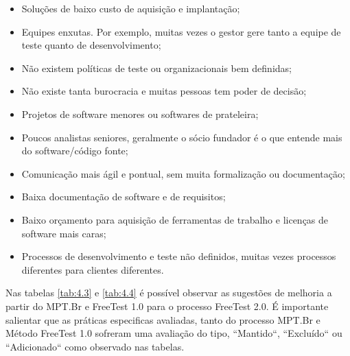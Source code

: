 \begin{itemize}
    \item Soluções de baixo custo de aquisição e implantação;
    \item Equipes enxutas. Por exemplo, muitas vezes o gestor gere tanto a equipe de teste quanto de desenvolvimento;
    \item Não existem políticas de teste ou organizacionais bem definidas;
    \item Não existe tanta burocracia e muitas pessoas tem poder de decisão;
    \item Projetos de software menores ou softwares de prateleira;
    \item Poucos analistas seniores, geralmente o sócio fundador é o que entende mais do software/código fonte;
    \item Comunicação mais ágil e pontual, sem muita formalização ou documentação;
    \item Baixa documentação de software e de requisitos;
    \item Baixo orçamento para aquisição de ferramentas de trabalho e licenças de software mais caras;
    \item Processos de desenvolvimento e teste não definidos, muitas vezes processos diferentes para clientes diferentes.
\end{itemize}

Nas tabelas \ref{tab:4.3} e \ref{tab:4.4} é possível observar as sugestões de melhoria a partir do MPT.Br e FreeTest 1.0 para o processo FreeTest 2.0. É importante salientar que as práticas especificas avaliadas, tanto do processo MPT.Br e Método FreeTest 1.0 sofreram uma avaliação do tipo, “Mantido“, “Excluído“ ou “Adicionado“ como observado nas tabelas. 

